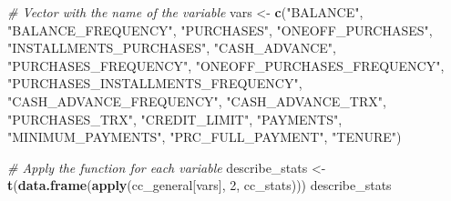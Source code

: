 \documentclass[11pt,]{article}
\newenvironment{Shaded}{\begin{snugshade}}{\end{snugshade}}
\newcommand{\KeywordTok}[1]{\textcolor[rgb]{0.13,0.29,0.53}{\textbf{#1}}}
\newcommand{\DecValTok}[1]{\textcolor[rgb]{0.00,0.00,0.81}{#1}}
\newcommand{\StringTok}[1]{\textcolor[rgb]{0.31,0.60,0.02}{#1}}
\newcommand{\CommentTok}[1]{\textcolor[rgb]{0.56,0.35,0.01}{\textit{#1}}}
\newcommand{\NormalTok}[1]{#1}
\begin{document}
\begin{Shaded}
\begin{Highlighting}[]
\CommentTok{# Vector with the name of the variable}
\NormalTok{vars <-}\StringTok{ }\KeywordTok{c}\NormalTok{(}\StringTok{"BALANCE"}\NormalTok{,}
          \StringTok{"BALANCE_FREQUENCY"}\NormalTok{,}
          \StringTok{"PURCHASES"}\NormalTok{,}
          \StringTok{"ONEOFF_PURCHASES"}\NormalTok{,}
          \StringTok{"INSTALLMENTS_PURCHASES"}\NormalTok{,          }
          \StringTok{"CASH_ADVANCE"}\NormalTok{,}
          \StringTok{"PURCHASES_FREQUENCY"}\NormalTok{,}
          \StringTok{"ONEOFF_PURCHASES_FREQUENCY"}\NormalTok{,}
          \StringTok{"PURCHASES_INSTALLMENTS_FREQUENCY"}\NormalTok{,}
          \StringTok{"CASH_ADVANCE_FREQUENCY"}\NormalTok{,}
          \StringTok{"CASH_ADVANCE_TRX"}\NormalTok{,}
          \StringTok{"PURCHASES_TRX"}\NormalTok{,}
          \StringTok{"CREDIT_LIMIT"}\NormalTok{,}
          \StringTok{"PAYMENTS"}\NormalTok{,}
          \StringTok{"MINIMUM_PAYMENTS"}\NormalTok{,}
          \StringTok{"PRC_FULL_PAYMENT"}\NormalTok{,}
          \StringTok{"TENURE"}\NormalTok{)}
\end{Highlighting}
\end{Shaded}

\begin{Shaded}
\begin{Highlighting}[]
\CommentTok{# Apply the function for each variable}
\NormalTok{describe_stats <-}\StringTok{ }\KeywordTok{t}\NormalTok{(}\KeywordTok{data.frame}\NormalTok{(}\KeywordTok{apply}\NormalTok{(cc_general[vars], }\DecValTok{2}\NormalTok{, cc_stats)))}
\NormalTok{describe_stats}
\end{Highlighting}
\end{Shaded}
\end{document}

